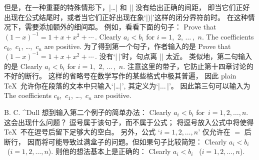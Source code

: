 但是，在一种重要的特殊情形下，|\ldots| 和 |\cdots| 没有给出正确的间距，
即当它们正好出现在公式结尾时，或者当它们正好出现在象`|)|'这样的闭分界符前时。%
在这种情况下，需要添加额外的细间距。%
例如，看看下面的句子：
\begindisplay
Prove that $(1-x)^{-1}=1+x+x^2+\cdots\,$.\cr
Clearly $a_i<b_i$ for $i=1$,~2, $\ldots\,$,~$n$.\cr
The coefficients $c_0$,~$c_1$, \dots,~$c_n$ are positive.\cr
\enddisplay
为了得到第一个句子，作者输入的是
\begintt
Prove that $(1-x)^{-1}=1+x+x^2+\cdots\,$.
\endtt
\1没有`|\,|'时，句点离 |\cdots| 太近。%
类似地，第二句输入的是
\begintt
Clearly $a_i<b_i$ for $i=1$,~2, $\ldots\,$,~$n$.
\endtt
注意这里的带子，它防止第十四章讨论的不好的断行。%
这样的省略号在数学写作的某些格式中极其普遍，
因此 plain \TeX\ 允许你在段落的文本中只输入`|\dots|', 其定义为`|$\ldots\,$|'。%
因此第三句可以输入为
\begintt
The coefficients $c_0$,~$c_1$, \dots,~$c_n$ are positive.
\endtt

\exercise B. C. ^{Dull} 想到输入第二个例子的简单办法：
\begintt
Clearly $a_i<b_i$ for~$i=1, 2, \ldots, n$.
\endtt
这会出现什么问题？
\answer 逗号属于该句子，而不属于公式；
将逗号放入公式中将使得 \TeX\ 不在逗号后留下足够大的空白。
另外，公式 `$i=1, 2, \ldots, n$' 仅允许在 $=$ 后断行，
因而将可能导致过满盒子的问题。但如果句子比较简短：
\begindisplay
Clearly $a_i<b_i$ \ ($i=1,2,\ldots,n$).
\enddisplay
则他的想法基本上是正确的：
\begintt
Clearly $a_i<b_i$ \ ($i=1,2,\ldots,n$).
\endtt

